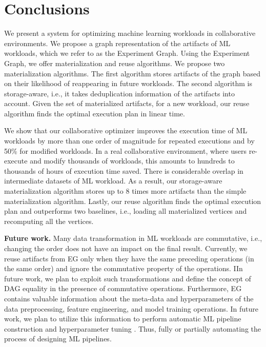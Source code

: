 \section{Conclusions} \label{sec-conclusion}
We present a system for optimizing machine learning workloads in collaborative environments.
We propose a graph representation of the artifacts of ML workloads, which we refer to as the Experiment Graph.
Using the Experiment Graph, we offer materialization and reuse algorithms.
We propose two materialization algorithms.
The first algorithm stores artifacts of the graph based on their likelihood of reappearing in future workloads.
The second algorithm is storage-aware, i.e., it takes deduplication information of the artifacts into account.
Given the set of materialized artifacts, for a new workload, our reuse algorithm finds the optimal execution plan in linear time.

We show that our collaborative optimizer improves the execution time of ML workloads by more than one order of magnitude for repeated executions and by 50\% for modified workloads.
In a real collaborative environment, where users re-execute and modify thousands of workloads, this amounts to hundreds to thousands of hours of execution time saved.
There is considerable overlap in intermediate datasets of ML workload.
As a result, our storage-aware materialization algorithm stores up to 8 times more artifacts than the simple materialization algorithm.
Lastly, our reuse algorithm finds the optimal execution plan and outperforms two baselines, i.e., loading all materialized vertices and recomputing all the vertices.

\textbf{Future work.}
Many data transformation in ML workloads are commutative, i.e., changing the order does not have an impact on the final result.
Currently, we reuse artifacts from EG only when they have the same preceding operations (in the same order) and ignore the commutative property of the operations.
IIn future work, we plan to exploit such transformations and define the concept of DAG equality in the presence of commutative operations.
Furthermore, EG contains valuable information about the meta-data and hyperparameters of the data preprocessing, feature engineering, and model training operations.
In future work, we plan to utilize this information to perform automatic ML pipeline construction and hyperparameter tuning \cite{Feurer15, thornton2013auto}.
Thus, fully or partially automating the process of designing ML pipelines.


